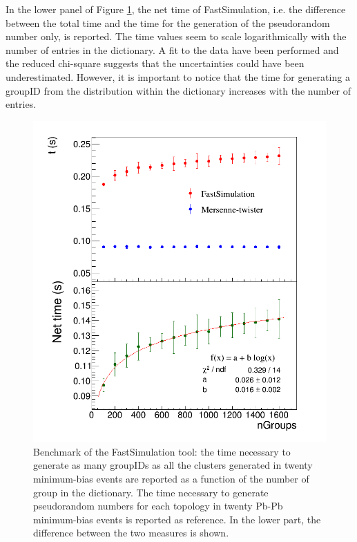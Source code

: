 In the lower panel of Figure \ref{fig:fastbench}, the net time of FastSimulation, i.e. the difference between the total time and the time for the generation of the pseudorandom number only, is reported. The time values seem to scale logarithmically with the number of entries in the dictionary. A fit to the data have been performed and the reduced chi-square suggests that the uncertainties could have been underestimated. However, it is important to notice that the time for generating a groupID from the distribution within the dictionary increases with the number of entries.
%
\begin{figure}
  \centering
  \includegraphics[scale=0.4]{figures/fastbench.png}
  \caption{Benchmark of the FastSimulation tool: the time necessary to generate as many groupIDs as all the clusters generated in twenty minimum-bias events are reported as a function of the number of group in the dictionary. The time necessary to generate pseudorandom numbers for each topology in twenty Pb-Pb minimum-bias events is reported as reference. In the lower part, the difference between the two measures is shown.}
  \label{fig:fastbench}
\end{figure}
%
